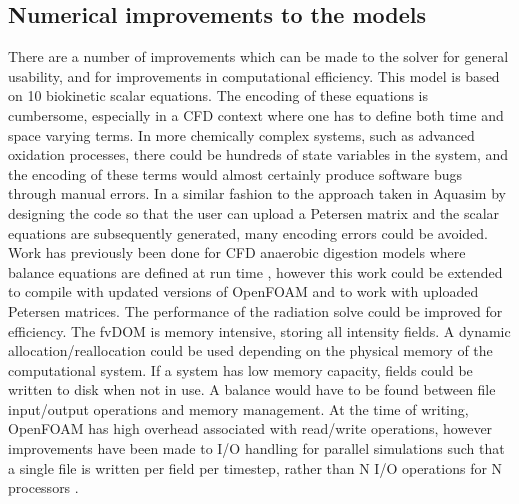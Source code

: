 \subsection{Numerical improvements to the models}
There are a number of improvements which can be made to the solver for general usability, and for improvements in computational efficiency. This model is based on 10 biokinetic scalar equations. The encoding of these equations is cumbersome, especially in a CFD context where one has to define both time and space varying terms. In more chemically complex systems, such as advanced oxidation processes, there could be hundreds of state variables in the system, and the encoding of these terms would almost certainly produce software bugs through manual errors. In a similar fashion to the approach taken in Aquasim \cite{reichert1994} by designing the code so that the user can upload a Petersen matrix and the scalar equations are subsequently generated, many encoding errors could be avoided. Work has previously been done for CFD anaerobic digestion models where balance equations are defined at run time \cite{gaden2013}, however this work could be extended to compile with updated versions of OpenFOAM and to work with uploaded Petersen matrices.
\skippingparagraph
The performance of the radiation solve could be improved for efficiency. The fvDOM is memory intensive, storing all intensity fields. A dynamic allocation/reallocation could be used depending on the physical memory of the computational system. If a system has low memory capacity, fields could be written to disk when not in use. A balance would have to be found between file input/output operations and memory management. At the time of writing, OpenFOAM has high overhead associated with read/write operations, however improvements have been made to I/O handling for parallel simulations such that a single file is written per field per timestep, rather than N I/O operations for N processors \cite{theopenfoamfoundation2017}. 

